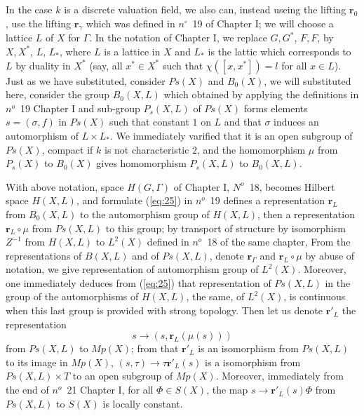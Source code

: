 \documentclass[12pt]{amsart}
\def\br{{\mathbf{r}}}
\newcounter{ssection}
\renewcommand{\subsection}{
  \addtocounter{ssection}{1}{\bf  \arabic{ssection}.\  }}
\begin{document}
\subsection{}
 In the case $k$ is a discrete valuation field,
we also can, instead useing the lifting $\br_0$, 
use the lifting $\br_\gamma$ which was defined in $n^\circ$~19 of Chapter I;
we will choose a lattice $L$ of $X$ for $\Gamma$. In the notation of Chapter I, 
we replace $G, G^*$, 
$F, F$, by $X, X^*$, $L$, $L_*$, where $L$ is a lattice in $X$ and $L_*$
is the lattic which corresponds to $L$ by duality in $X^*$
(say, all $x^*\in X^*$ such that $\chi([x, x^*]) =l$ for all $x\in L$).
Just as we have substituted,  consider $Ps(X)$ and $B_0(X)$,
we will substituted here, consider the group $B_0(X, L)$ 
which obtained by applying the definitions in $n^o$~19 Chapter I and 
sub-group $P_s(X, L)$ of $Ps(X)$ forms elements $s=(\sigma, f)$ in $Ps(X)$
such that constant $1$ on $L$ and that $\sigma$
induces an automorphism of $L\times L_*$. 
We immediately varified that it is an open subgroup of $Ps(X)$,
compact if $k$ is not characteristic $2$,
and the homomorphism $\mu$ from $P_s(X)$ to $B_0(X)$
 gives homomorphism $P_s(X, L)$ to $B_0(X, L)$. 

With above notation, space $H(G,\Gamma)$ of Chapter I, $N^o$~18, 
becomes Hilbert space $H(X,L)$, and formulate (\ref{eq:25})
in $n^o$~19  defines a representation $\br_L$ from $B_0(X,L)$ to 
the automorphism group of $H(X,L)$, then a representation 
$\br_L\circ \mu$ from $Ps(X, L)$ to this group;
by transport of structure by isomorphism 
$Z^{-1}$ from $H(X,L)$ to $L^2(X)$ defined in $n^o$~18 of the same chapter,
From the representations of $B(X, L)$ and of $Ps (X, L)$, denote $\br_\Gamma$
and $\br_L\circ \mu$ by abuse of notation, we give representation of 
automorphism group of $L^2(X)$.
Moreover, one immediately deduces from (\ref{eq:25}) that 
representation of $Ps(X, L)$ in the group of the automorphisms of $H(X, L)$, 
the same, of $L^2(X)$, 
is continuous when this last group is provided with strong topology. 
Then let us denote $\br'_L$ the representation
\[
s\to (s,\br_L(\mu(s)))
\]
from $Ps(X,L)$ to $Mp(X)$;
from that $\br'_L$ is an isomorphism from $Ps(X, L)$ 
to its image in $Mp(X)$, $(s,\tau)\to \tau \br'_L(s)$ is a isomorphism from 
$Ps(X,L)\times T$ to an open subgroup of $Mp(X)$. 
Moreover, immediately from the end of  $n^o$~21  
Chapter I, for all $\Phi\in S(X)$, the map $s\to \br'_L(s)\Phi$ from $Ps(X,L)$
to $S(X)$ is locally constant.  
\end{document}
